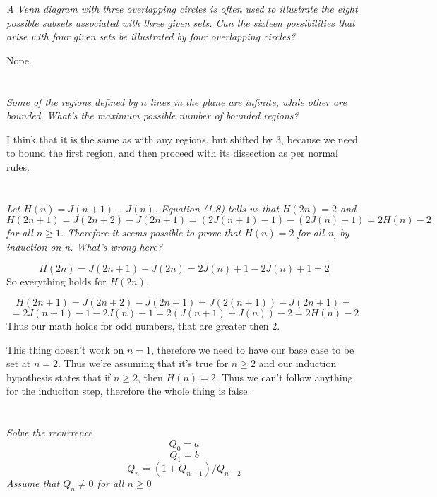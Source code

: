 \documentclass[11pt,oneside,titlepage]{book}
\begin{document}
\textit{A Venn diagram with three overlapping circles is often used to illustrate the eight
  possible subsets associated with three given sets. Can the sixteen possibilities that arise
  with four given sets be illustrated by four overlapping circles?}

Nope. 

\section{}

\textit{Some of the regions defined by $n$ lines in the plane are infinite, while other are
  bounded. What's the maximum possible number of bounded regions?}

I think that it is the same as with any regions, but shifted by 3, because we need to bound the
first region, and then proceed with its dissection as per normal rules.

\section{}

\textit{Let $H(n) = J(n + 1) - J(n)$. Equation (1.8) tells us that $H(2n) = 2$ and
  $H(2n + 1) = J(2n + 2) - J(2n + 1) = (2J(n + 1) - 1) - (2J(n) + 1) = 2H(n) - 2$
  for all $n \geq 1$. Therefore it seems possible to prove that $H(n) = 2$ for all n,
  by induction on n. What's wrong here?}

$$H(2n) = J(2n + 1) - J(2n) = 2J(n) + 1 - 2J(n) + 1 = 2$$
So everything holds for $H(2n)$.

$$H(2n + 1) = J(2n + 2) - J(2n + 1) = J(2(n + 1)) - J(2n + 1) = $$
$$ = 2J(n + 1) - 1 - 2J(n) - 1 = 2(J(n + 1) - J(n)) - 2 = 2H(n) - 2$$
Thus our math holds for odd numbers, that are greater then 2.

This thing doesn't work on $n = 1$, therefore we need to have our base case to be set at $n = 2$.
Thus we're assuming that it's true for $n \geq 2$ and our induction hypothesis
states that if $n \geq 2$, then $H(n) = 2$. Thus we can't follow anything for the induciton
step, therefore the whole thing is false.


\section{}

\textit{Solve the recurrence }
$$Q_0 = a$$
$$Q_1 = b$$
$$Q_n = (1 + Q_{n - 1})/Q_{n - 2}$$
\textit{Assume that $Q_n \neq 0$ for all $n \geq 0$}
\end{document}
